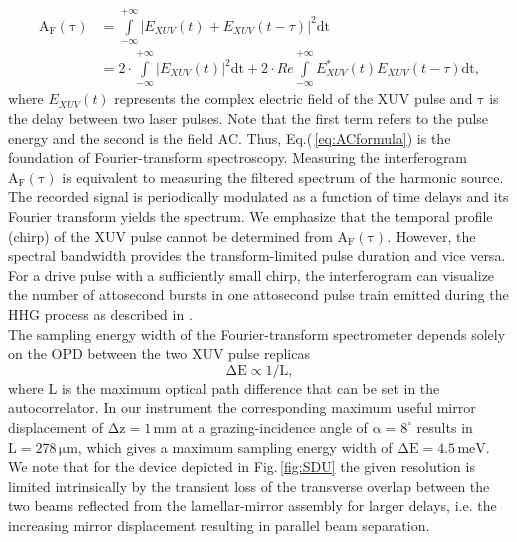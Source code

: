 \documentclass[fleqn,10pt]{wlscirep}
\begin{document}
\begin{equation}
\begin{split}
    \mathrm{A_{F}(\tau)}&=\int\limits_{-\infty}^{+\infty}\vert E_{XUV}(t)+E_{XUV}(t-\tau)\vert^{2} \mathrm{dt}\\
    &=2\cdot \int\limits_{-\infty}^{+\infty}\vert E_{XUV}(t)\vert^{2} \mathrm{dt}+2\cdot Re \int\limits_{-\infty}^{+\infty}E^{\ast}_{XUV}(t)E_{XUV}(t-\tau)\mathrm{dt},
\end{split}
\label{eq:ACformula}
\end{equation}
where $E_{XUV}(t)$ represents the complex electric field of the XUV pulse and $\mathrm{\tau}$ is the delay between two laser pulses. Note that the first term refers to the pulse energy and the second is the field AC. Thus, Eq.(\,\ref{eq:ACformula}) is the foundation of Fourier-transform spectroscopy. Measuring the interferogram $\mathrm{A_{F}(\tau)}$ is equivalent to measuring the filtered spectrum of the harmonic source. The recorded signal is periodically modulated as a function of time delays and its Fourier transform yields the spectrum. We emphasize that the temporal profile (chirp) of the XUV pulse cannot be determined from $\mathrm{A_{F}(\tau)}$. However, the spectral bandwidth provides the transform-limited pulse duration and vice versa. For a drive pulse with a sufficiently small chirp, the interferogram can visualize the number of attosecond bursts in one attosecond pulse train emitted during the HHG process as described in \cite{Chen2014}.\\

The sampling energy width of the Fourier-transform spectrometer depends solely on the OPD between the two XUV pulse replicas
\begin{equation}
    \mathrm{\Delta E \propto 1/L},
    \label{eq:FTresolution}
\end{equation}
where L is the maximum optical path difference that can be set in the autocorrelator. In our instrument the corresponding maximum useful mirror displacement of $\mathrm{\Delta z=1\,mm}$ at a grazing-incidence angle of $\mathrm{\alpha=8^{\circ}}$ results in $\mathrm{L=278\,\mu m}$, which gives a maximum sampling energy width of $\mathrm{\Delta E = 4.5\,meV}$. We note that for the device depicted in Fig.\,\ref{fig:SDU} the given resolution is limited intrinsically by the transient loss of the transverse overlap between the two beams reflected from the lamellar-mirror assembly for larger delays, i.e. the increasing mirror displacement resulting in parallel beam separation.\\
\end{document}
